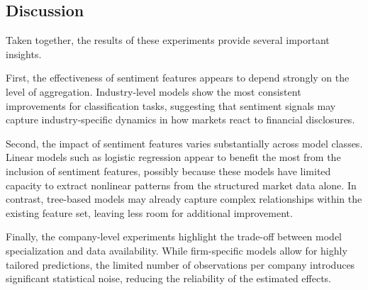 \subsection{Discussion}

Taken together, the results of these experiments provide several important insights.

First, the effectiveness of sentiment features appears to depend strongly on the level of aggregation. Industry-level models show the most consistent improvements for classification tasks, suggesting that sentiment signals may capture industry-specific dynamics in how markets react to financial disclosures.

Second, the impact of sentiment features varies substantially across model classes. Linear models such as logistic regression appear to benefit the most from the inclusion of sentiment features, possibly because these models have limited capacity to extract nonlinear patterns from the structured market data alone. In contrast, tree-based models may already capture complex relationships within the existing feature set, leaving less room for additional improvement.

Finally, the company-level experiments highlight the trade-off between model specialization and data availability. While firm-specific models allow for highly tailored predictions, the limited number of observations per company introduces significant statistical noise, reducing the reliability of the estimated effects.